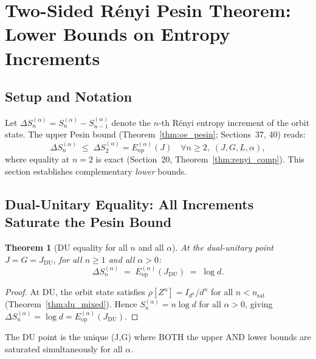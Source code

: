 \documentclass[12pt,a4paper]{article}
\newtheorem{theorem}{Theorem}[section]
\begin{document}
\section{Two-Sided Rényi Pesin Theorem: Lower Bounds on Entropy Increments}
\label{sec:two_sided}

\subsection{Setup and Notation}
\label{subsec:twosided_setup}

Let $\Delta S_n^{(\alpha)}=S_n^{(\alpha)}-S_{n-1}^{(\alpha)}$ denote the $n$-th
Rényi entropy increment of the orbit state.
The upper Pesin bound (Theorem~\ref{thm:oe_pesin}; Sections~37, 40) reads:
\[
  \Delta S_n^{(\alpha)}\;\leq\; \Delta S_2^{(\alpha)}=E_\mathrm{op}^{(\alpha)}(J)
  \quad\forall n\geq2,\;(J,G,L,\alpha),
\]
where equality at $n=2$ is exact (Section~20, Theorem~\ref{thm:renyi_comp}).
This section establishes complementary \emph{lower} bounds.

\subsection{Dual-Unitary Equality: All Increments Saturate the Pesin Bound}
\label{subsec:du_all_n}

\begin{theorem}[DU equality for all $n$ and all $\alpha$]\label{thm:du_all_increments}
At the dual-unitary point $J=G=J_{\mathrm{DU}}$, for all $n\geq1$ and all $\alpha>0$:
\[
  \Delta S_n^{(\alpha)}\;=\;E_\mathrm{op}^{(\alpha)}(J_{\mathrm{DU}})\;=\;\log d.
\]
\end{theorem}

\begin{proof}
At DU, the orbit state satisfies $\rho[Z^n]=I_{d^n}/d^n$ for all $n<n_\mathrm{sat}$
(Theorem~\ref{thm:du_mixed}).
Hence $S_n^{(\alpha)} = n\log d$ for all $\alpha>0$, giving
$\Delta S_n^{(\alpha)}=\log d=E_\mathrm{op}^{(\alpha)}(J_\mathrm{DU})$.
\end{proof}

The DU point is the unique (J,G) where BOTH the upper AND lower bounds are saturated
simultaneously for all $\alpha$.
\end{document}
